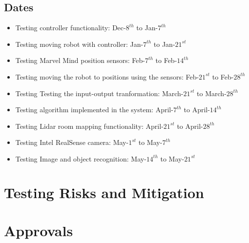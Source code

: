 \documentclass[english,12pt]{article}
\begin{document}
\subsection{Dates}
\begin{itemize}
    \item[] Testing controller functionality: Dec-$8^{th}$ to Jan-$7^{th}$
    \item[] Testing moving robot with controller: Jan-$7^{th}$ to Jan-$21^{st}$
    \item[] Testing Marvel Mind position sensors: Feb-$7^{th}$ to Feb-$14^{th}$
    \item[] Testing moving the robot to positions using the sensors: Feb-$21^{st}$ to Feb-$28^{th}$
    \item[] Testing Testing the input-output tranformation: March-$21^{st}$ to March-$28^{th}$
    \item[] Testing algorithm implemented in the system: April-$7^{th}$ to April-$14^{th}$
    \item[] Testing Lidar room mapping functionality: April-$21^{st}$ to April-$28^{th}$
    \item[] Testing Intel RealSense camera: May-$1^{st}$ to May-$7^{th}$
    \item[] Testing Image and object recognition: May-$14^{th}$ to May-$21^{st}$ 
\end{itemize}
\section{Testing Risks and Mitigation}

\section{Approvals}
\end{document}
